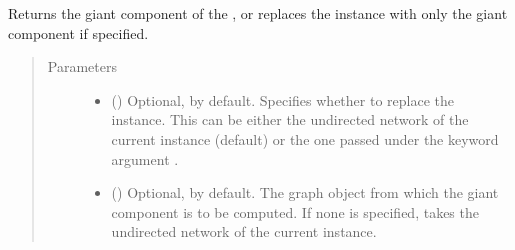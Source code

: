 \documentclass[letterpaper,10pt,english]{sphinxmanual}
\begin{document}
\begin{fulllineitems}
\begin{fulllineitems}
\begin{quote}
\begin{description}
\begin{itemize}
\end{itemize}

\end{description}\end{quote}

\end{fulllineitems}


\begin{fulllineitems}
\label{\detokenize{reference:pypath.main.PyPath.get_function}}
\end{fulllineitems}


\begin{fulllineitems}
\label{\detokenize{reference:pypath.main.PyPath.get_giant}}
Returns the giant component of the , or replaces the
 instance with only the giant component
if specified.
\begin{quote}\begin{description}
\item[{Parameters}] \leavevmode\begin{itemize}
\item {} 
 () \textendash{} Optional,  by default. Specifies whether to replace
the  instance. This can be either
the undirected network of the current
{\hyperref[\detokenize{reference:pypath.main.PyPath}]{}} instance (default) or the one
passed under the keyword argument .

\item {} 
 () \textendash{} Optional,  by default. The graph object from which
the giant component is to be computed. If none is specified,
takes the undirected network of the current
{\hyperref[\detokenize{reference:pypath.main.PyPath}]{}} instance.


\end{itemize}
\end{description}
\end{quote}
\end{fulllineitems}
\end{fulllineitems}
\end{document}
